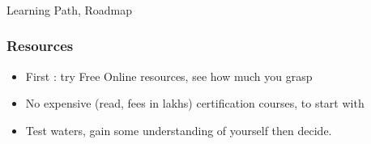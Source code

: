 \begin{frame}[fragile]\frametitle{}
	
	\begin{center}
	{\Large Learning Path, Roadmap}  
	\end{center}

\end{frame}




\begin{frame}[fragile]\frametitle{Resources}

      \begin{itemize}
			\item First : try Free Online resources, see how much you grasp
			\item No expensive (read, fees in lakhs) certification courses, to start with
			\item Test waters, gain some understanding of yourself then decide.
			\end{itemize}
			
\end{frame}


